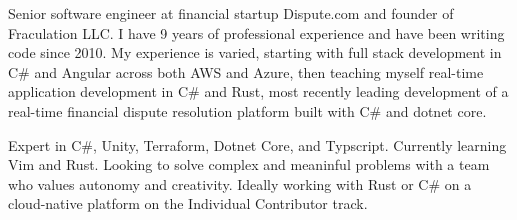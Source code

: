 

\begin{cvparagraph}

Senior software engineer at financial startup Dispute.com and founder of Fraculation LLC.\@
I have 9 years of professional experience and have been writing code since 2010. My experience is varied, starting with 
full stack development in C\# and Angular across both AWS and Azure, then teaching myself real-time application development in C\# and Rust,
most recently leading development of a real-time financial dispute resolution platform built with C\# and dotnet core.



Expert in C\#, Unity, Terraform, Dotnet Core, and Typscript. Currently learning Vim and Rust. 
Looking to solve complex and meaninful problems with a team who values autonomy and creativity.
Ideally working with Rust or C\# on a cloud-native platform on the Individual Contributor track.

\end{cvparagraph}
